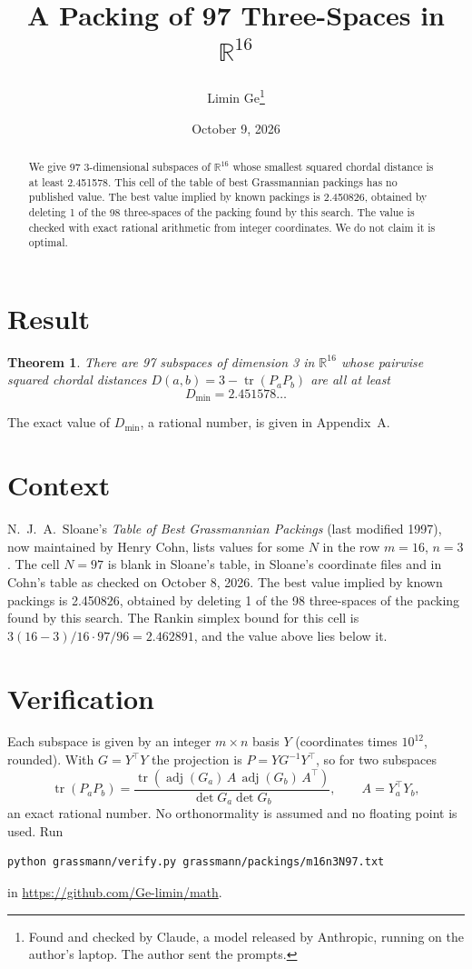 \documentclass[11pt,a4paper]{article}
\title{A Packing of 97 Three-Spaces in $\mathbb{R}^{16}$}
\author{Limin Ge\thanks{Found and checked by Claude, a model released by Anthropic, running on the author's laptop. The author sent the prompts.}}
\date{October 9, 2026}
\newtheorem*{theorem}{Theorem}
\begin{document}
\maketitle
\begin{abstract}
We give 97 3-dimensional subspaces of $\mathbb{R}^{16}$ whose smallest squared chordal distance is at least 2.451578. This cell of the table of best Grassmannian packings has no published value. The best value implied by known packings is 2.450826, obtained by deleting 1 of the 98 three-spaces of the packing found by this search. The value is checked with exact rational arithmetic from integer coordinates. We do not claim it is optimal.
\end{abstract}

\section{Result}
\begin{theorem}
There are 97 subspaces of dimension 3 in $\mathbb{R}^{16}$ whose pairwise squared chordal distances $D(a,b) = 3 - \operatorname{tr}(P_aP_b)$ are all at least
\[ D_{\min} = 2.451578\ldots \]
\end{theorem}
The exact value of $D_{\min}$, a rational number, is given in Appendix~A.


\section{Context}
N.~J.~A.~Sloane's \emph{Table of Best Grassmannian Packings} (last modified 1997), now maintained by Henry Cohn, lists values for some $N$ in the row $m=16$, $n=3$. The cell $N=97$ is blank in Sloane's table, in Sloane's coordinate files and in Cohn's table as checked on October 8, 2026. The best value implied by known packings is 2.450826, obtained by deleting 1 of the 98 three-spaces of the packing found by this search. The Rankin simplex bound for this cell is $3(16-3)/16\cdot 97/96 = 2.462891$, and the value above lies below it.


\section{Verification}
Each subspace is given by an integer $m\times n$ basis $Y$ (coordinates times $10^{12}$, rounded). With $G=Y^\top Y$ the projection is $P=YG^{-1}Y^\top$, so for two subspaces
\[ \operatorname{tr}(P_aP_b)=\frac{\operatorname{tr}(\operatorname{adj}(G_a)\,A\,\operatorname{adj}(G_b)\,A^\top)}{\det G_a\det G_b},\qquad A=Y_a^\top Y_b, \]
an exact rational number. No orthonormality is assumed and no floating point is used. Run
\begin{verbatim}
python grassmann/verify.py grassmann/packings/m16n3N97.txt
\end{verbatim}
in \url{https://github.com/Ge-limin/math}.
\end{document}
